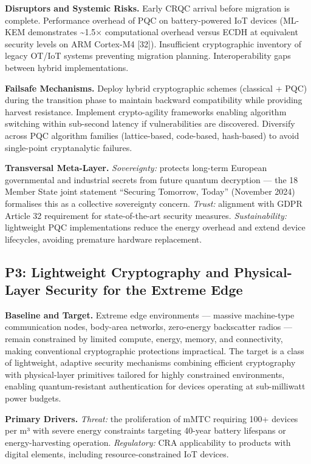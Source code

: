 \documentclass{ieeeaccess}
\begin{document}
\textbf{Disruptors and Systemic Risks.} Early CRQC arrival before
migration is complete. Performance overhead of PQC on battery-powered
IoT devices (ML-KEM demonstrates \textasciitilde1.5× computational
overhead versus ECDH at equivalent security levels on ARM Cortex-M4
{[}32{]}). Insufficient cryptographic inventory of legacy OT/IoT systems
preventing migration planning. Interoperability gaps between hybrid
implementations.

\textbf{Failsafe Mechanisms.} Deploy hybrid cryptographic schemes
(classical + PQC) during the transition phase to maintain backward
compatibility while providing harvest resistance. Implement
crypto-agility frameworks enabling algorithm switching within sub-second
latency if vulnerabilities are discovered. Diversify across PQC
algorithm families (lattice-based, code-based, hash-based) to avoid
single-point cryptanalytic failures.

\textbf{Transversal Meta-Layer.} \emph{Sovereignty:} protects long-term
European governmental and industrial secrets from future quantum
decryption --- the 18 Member State joint statement ``Securing Tomorrow,
Today'' (November 2024) formalises this as a collective sovereignty
concern. \emph{Trust:} alignment with GDPR Article 32 requirement for
state-of-the-art security measures. \emph{Sustainability:} lightweight
PQC implementations reduce the energy overhead and extend device
lifecycles, avoiding premature hardware replacement.

\subsection{P3: Lightweight Cryptography and Physical-Layer Security
for the Extreme
Edge}\label{p3-lightweight-cryptography-and-physical-layer-security-for-the-extreme-edge}

\textbf{Baseline and Target.} Extreme edge environments --- massive
machine-type communication nodes, body-area networks, zero-energy
backscatter radios --- remain constrained by limited compute, energy,
memory, and connectivity, making conventional cryptographic protections
impractical. The target is a class of lightweight, adaptive security
mechanisms combining efficient cryptography with physical-layer
primitives tailored for highly constrained environments, enabling
quantum-resistant authentication for devices operating at sub-milliwatt
power budgets.

\textbf{Primary Drivers.} \emph{Threat:} the proliferation of mMTC
requiring 100+ devices per m³ with severe energy constraints targeting
40-year battery lifespans or energy-harvesting operation.
\emph{Regulatory:} CRA applicability to products with digital elements,
including resource-constrained IoT devices.
\end{document}
